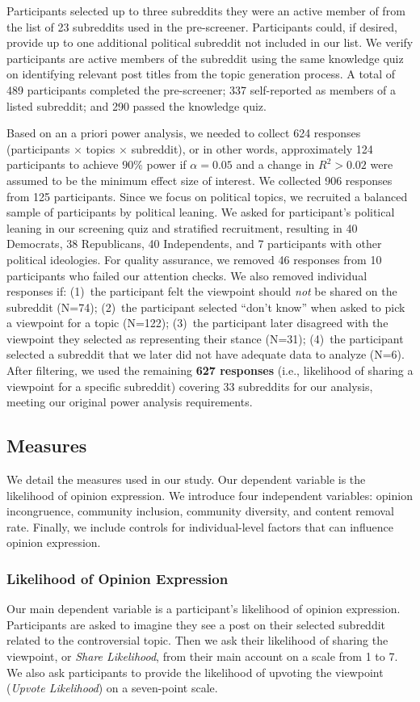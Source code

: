 Participants selected up to three subreddits they were an active member of from the list of 23 subreddits used in the pre-screener. Participants could, if desired, provide up to one additional political subreddit not included in our list. We verify participants are active members of the subreddit using the same knowledge quiz on identifying relevant post titles from the topic generation process. A total of 489 participants completed the pre-screener; 337 self-reported as members of a listed subreddit; and 290 passed the knowledge quiz.

Based on an a priori power analysis, we needed to collect 624 responses (participants $\times$ topics $\times$ subreddit), or in other words, approximately 124 participants to achieve $90\%$ power if $\alpha=0.05$ and a change in $R^2 > 0.02$ were assumed to be the minimum effect size of interest. We collected 906 responses from 125 participants. Since we focus on political topics, we recruited a balanced sample of participants by political leaning. We asked for participant's political leaning in our screening quiz and stratified recruitment, resulting in 40 Democrats, 38 Republicans, 40 Independents, and 7 participants with other political ideologies. For quality assurance, we removed 46 responses from 10 participants who failed our attention checks. We also removed individual responses if: (1)~the participant felt the viewpoint should \emph{not} be shared on the subreddit (N=74); (2)~the participant selected ``don't know'' when asked to pick a viewpoint for a topic (N=122); (3)~the participant later disagreed with the viewpoint they selected as representing their stance (N=31); (4)~the participant selected a subreddit that we later did not have adequate data to analyze (N=6). After filtering, we used the remaining \textbf{627 responses} (i.e., likelihood of sharing a viewpoint for a specific subreddit) covering 33 subreddits for our analysis, meeting our original power analysis requirements.


\subsection{Measures}
We detail the measures used in our study. Our dependent variable is the likelihood of opinion expression. We introduce four independent variables: opinion incongruence, community inclusion, community diversity, and content removal rate. Finally, we include controls for individual-level factors that can influence opinion expression.

\subsubsection{Likelihood of Opinion Expression}
Our main dependent variable is a participant's likelihood of opinion expression. Participants are asked to imagine they see a post on their selected subreddit related to the controversial topic. Then we ask their likelihood of sharing the viewpoint, or \textit{Share Likelihood}, from their main account on a scale from 1 to 7. We also ask participants to provide the likelihood of upvoting the viewpoint (\textit{Upvote Likelihood}) on a seven-point scale. 
